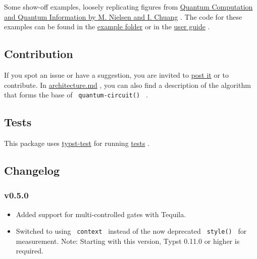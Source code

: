 Some show-off examples, loosely replicating figures from
\href{https://www.cambridge.org/highereducation/books/quantum-computation-and-quantum-information/01E10196D0A682A6AEFFEA52D53BE9AE\#overview}{Quantum
Computation and Quantum Information by M. Nielsen and I. Chuang} . The
code for these examples can be found in the
\href{https://github.com/Mc-Zen/quill/tree/v0.5.0/examples}{example
folder} or in the
\href{https://github.com/Mc-Zen/quill/releases/download/v0.5.0/quill-guide.pdf}{user
guide} .




\subsection{Contribution}\label{contribution}

If you spot an issue or have a suggestion, you are invited to
\href{https://github.com/Mc-Zen/quill/issues}{post it} or to contribute.
In
\href{https://github.com/Mc-Zen/quill/tree/v0.5.0/docs/architecture.md}{architecture.md}
, you can also find a description of the algorithm that forms the base
of \texttt{\ quantum-circuit()\ } .

\subsection{Tests}\label{tests}

This package uses
\href{https://github.com/tingerrr/typst-test/}{typst-test} for running
\href{https://github.com/Mc-Zen/quill/tree/v0.5.0/tests/}{tests} .

\subsection{Changelog}\label{changelog}

\subsubsection{v0.5.0}\label{v0.5.0}

\begin{itemize}
\tightlist
\item
  Added support for multi-controlled gates with Tequila.
\item
  Switched to using \texttt{\ context\ } instead of the now deprecated
  \texttt{\ style()\ } for measurement. Note: Starting with this
  version, Typst 0.11.0 or higher is required.
\end{itemize}

